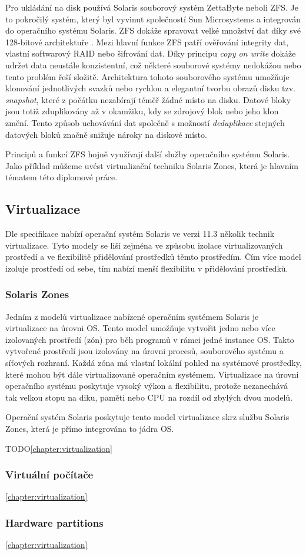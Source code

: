 Pro ukládání na disk používá Solaris souborový systém ZettaByte neboli ZFS. Je to pokročilý systém, který byl vyvinut společností Sun Microsystems a integrován do operačního systému Solaris. ZFS dokáže spravovat velké množství dat díky své 128-bitové 
architektuře \cite{cvut:thesis:mythesis}. Mezi hlavní funkce ZFS patří ověřování integrity dat, vlastní softwarový RAID nebo šifrování dat. Díky principu \textit{copy on write} dokáže udržet data neustále konzistentní, což některé souborové systémy nedokážou nebo tento problém řeší složitě.
Architektura tohoto souborového systému umožňuje klonování jednotlivých svazků nebo rychlou a elegantní tvorbu obrazů disku tzv. \textit{snapshot}, které z počátku nezabírají téměř žádné místo na disku. Datové bloky jsou totiž zduplikovány až v okamžiku,
kdy se zdrojový blok nebo jeho klon změní. Tento způsob uchovávání dat společně s možností \textit{deduplikace} stejných datových bloků značně snižuje nároky na diskové místo.

Principů a funkcí ZFS hojně využívají další služby operačního systému Solaris. Jako příklad můžeme uvést virtualizační techniku Solaris Zones, která je hlavním tématem této diplomové práce.

\subsection{Virtualizace}

Dle specifikace \cite{oracle:solaris:virtualization} nabízí operační systém Solaris ve verzi 11.3 několik technik virtualizace. Tyto modely se liší zejména ve způsobu izolace virtualizovaných prostředí a ve flexibilitě přidělování prostředků
těmto prostředím. Čím více model izoluje prostředí od sebe, tím nabízí menší flexibilitu v přidělování prostředků.

\subsubsection{Solaris Zones}

Jedním z modelů virtualizace nabízené operačním systémem Solaris je virtualizace na úrovni OS. Tento model umožňuje vytvořit jedno nebo více izolovaných prostředí (zón) pro běh programů v rámci jedné instance OS. Takto vytvořené prostředí jsou
izolovány na úrovni procesů, souborového systému a síťových rozhraní. Každá zóna má vlastní lokální pohled na systémové prostředky, které mohou být dále virtualizované operačním systémem. Virtualizace na úrovni operačního systému poskytuje vysoký výkon a flexibilitu,
protože nezanechává tak velkou stopu na diku, paměti nebo CPU na rozdíl od zbylých dvou modelů. 

Operační systém Solaris poskytuje tento model virtualizace skrz službu Solaris Zones, která je přímo integrována to jádra OS.

TODO\ref{chapter:virtualization}

\subsubsection{Virtuální počítače}


\ref{chapter:virtualization}

\subsubsection{Hardware partitions}

\ref{chapter:virtualization}